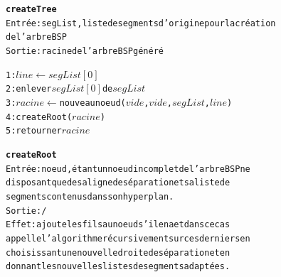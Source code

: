 \documentclass[11pt,a4paper]{article}
\begin{document}
\begin{alltt}
\textbf{createTree}
Entrée : segList, liste de segments d'origine pour la création 
de l'arbre BSP
Sortie : racine de l'arbre BSP généré

1: \(line \leftarrow segList[0]\)
2: enlever \(segList[0]\) de \(segList\)
3: \(racine\) \(\leftarrow\) nouveau noeud (\(vide\), \(vide\), \(segList\), \(line\))
4: createRoot(\(racine\))
5: retourner \(racine\)
\end{alltt}

\begin{alltt}
\textbf{createRoot}
Entrée : noeud, étant un noeud incomplet de l'arbre BSP ne
disposant que de sa ligne de séparation et sa liste de
segments contenus dans son hyperplan.
Sortie : /
Effet : ajoute les fils au noeud s'il en a et dans ce cas 
appelle l'algorithme récursivement sur ces derniers en 
choisissant une nouvelle droite de séparation et en 
donnant les nouvelles listes de segments adaptées.


\end{alltt}
\end{document}
